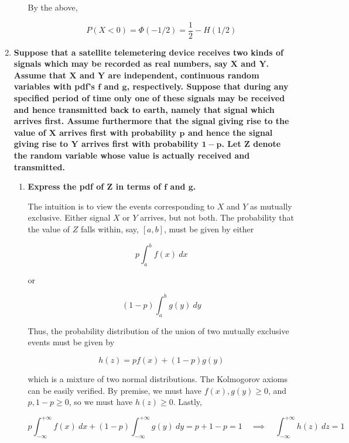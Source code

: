 \documentclass[10pt, oneside]{article}   	%
\theoremstyle{definition}
\begin{document}
\begin{enumerate}[label=9.\arabic*]
\begin{enumerate}
	By the above,
	
	\[ P(X < 0) = \Phi(-1/2) = \boxed{ \frac{1}{2} - H(1/2) } \]
	\end{enumerate}

\newpage
\item  \begin{tcolorbox}[
  colback=Cerulean!5!white,
  colframe=Cerulean!75!black]
\textbf{Suppose that a satellite telemetering device receives two kinds of signals which may be recorded as real numbers, say $\bm{X}$ and $\bm{Y}$. Assume that $\bm{X}$ and $\bm{Y}$ are independent, continuous random variables with pdf's $\bm{f}$ and $\bm{g}$, respectively. Suppose that during any specified period of time only one of these signals may be received and hence transmitted back to earth, namely that signal which arrives first. Assume furthermore that the signal giving rise to the value of $\bm{X}$ arrives first with probability $\bm{p}$ and hence the signal giving rise to $\bm{Y}$ arrives first with probability $\bm{1-p}$. Let $\bm{Z}$ denote the random variable whose value is actually received and transmitted.}
\end{tcolorbox}

	\begin{enumerate}
	\item  \begin{tcolorbox}[
	  colback=Cerulean!5!white,
	  colframe=Cerulean!75!black]
	\textbf{Express the pdf of $\bm{Z}$ in terms of $\bm{f}$ and $\bm{g}$.}
	\end{tcolorbox}
	
	The intuition is to view the events corresponding to $X$ and $Y$ as mutually exclusive. Either signal $X$ or $Y$ arrives, but not both. The probability that the value of $Z$ falls within, say, $[a,b]$, must be given by either
	
	\[ p \int^b_a f(x) \ dx \]
	
	or
	
	\[ (1-p) \int^b_a g(y) \ dy \]
	
	Thus, the probability distribution of the union of two mutually exclusive events must be given by
	
	\[ \boxed{ h(z) = p f(x) + (1-p) g(y) } \]
	
	which is a mixture of two normal distributions. The Kolmogorov axioms can be easily verified. By premise, we must have $f(x), g(y) \geq 0$, and $p, 1-p \geq 0$, so we must have $h(z) \geq 0$. Lastly,
	
	\[ p \int^{+\infty}_{-\infty} f(x) \ dx + (1-p) \int^{+\infty}_{-\infty} g(y) \ dy = p + 1 - p = 1 \quad \implies \quad \int^{+\infty}_{-\infty} h(z) \ dz = 1 \]
	

\end{enumerate}
\end{enumerate}
\end{document}
